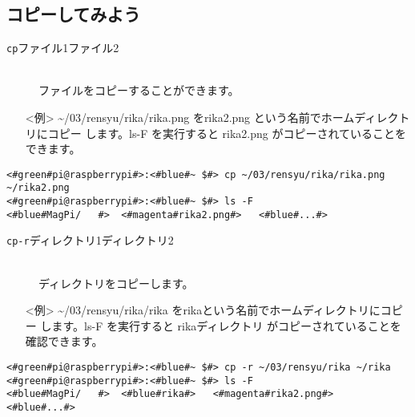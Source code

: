 \subsection{コピーしてみよう}
\begin{description}
\item[\texttt{cp}\textvisiblespace ファイル1\textvisiblespace ファイル2]\mbox{}\\
ファイルをコピーすることができます。
\end{description}
\begin{itemize}
\item[<例>]\textasciitilde /03/rensyu/rika/rika.png をrika2.png という名前でホームディレクトリにコピー
します。ls\textvisiblespace -F を実行すると rika2.png がコピーされていることをできます。
\end{itemize}
\begin{lstlisting}[caption=cpの例, label=cp]
<#green#pi@raspberrypi#>:<#blue#~ $#> cp ~/03/rensyu/rika/rika.png ~/rika2.png
<#green#pi@raspberrypi#>:<#blue#~ $#> ls -F
<#blue#MagPi/	#>	<#magenta#rika2.png#>	<#blue#...#>
\end{lstlisting}
\begin{description}
\item[\texttt{cp}\textvisiblespace \texttt{-r}\textvisiblespace ディレクトリ1\textvisiblespace ディレクトリ2]\mbox{}\\
ディレクトリをコピーします。
\end{description}
\begin{itemize}
\item[<例>]\textasciitilde /03/rensyu/rika/rika をrikaという名前でホームディレクトリにコピー
します。ls\textvisiblespace -F を実行すると rikaディレクトリ がコピーされていることを確認できます。
\end{itemize}
\begin{lstlisting}[caption=cp -rの例, label=cp-R]
<#green#pi@raspberrypi#>:<#blue#~ $#> cp -r ~/03/rensyu/rika ~/rika
<#green#pi@raspberrypi#>:<#blue#~ $#> ls -F
<#blue#MagPi/	#>	<#blue#rika#>	<#magenta#rika2.png#>	<#blue#...#>
\end{lstlisting}
\begin{tcolorbox}[title=\useOmetoi]
\begin{enumerate}
\end{enumerate}
\end{tcolorbox}
